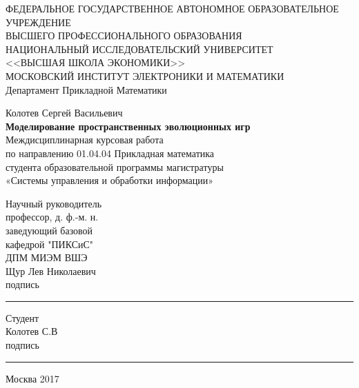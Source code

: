 \documentclass[14pt]{article}
\begin{document}
\begin{titlepage}
	\begin{center}
		ФЕДЕРАЛЬНОЕ ГОСУДАРСТВЕННОЕ АВТОНОМНОЕ ОБРАЗОВАТЕЛЬНОЕ  \\
		УЧРЕЖДЕНИЕ \\
		ВЫСШЕГО ПРОФЕССИОНАЛЬНОГО ОБРАЗОВАНИЯ \\
		НАЦИОНАЛЬНЫЙ ИССЛЕДОВАТЕЛЬСКИЙ УНИВЕРСИТЕТ\\
		<<ВЫСШАЯ ШКОЛА ЭКОНОМИКИ>> \\
		МОСКОВСКИЙ ИНСТИТУТ ЭЛЕКТРОНИКИ И МАТЕМАТИКИ \\
		\vspace{5ex}
		Департамент Прикладной Математики
		\vspace{0.5ex}
		
	\end{center}
	
	\vspace{15ex}
	\begin{center}
		Колотев Сергей Васильевич\\
		\vspace{1ex}
		\textbf{Моделирование пространственных эволюционных игр}\\
		\vspace{5ex}
		Междисциплинарная курсовая работа\\ 
		по направлению 01.04.04   Прикладная математика\\
		студента образовательной программы магистратуры\\
		«Системы управления и обработки информации»
		
		
	\end{center}	
	\vspace{15ex}
	\begin{flushright}
		\noindent
		Научный руководитель
		\\
		профессор, д. ф.-м. н.\\
		заведующий базовой\\
		кафедрой "ПИКСиС"\\
		ДПМ МИЭМ ВШЭ\\
		Щур Лев Николаевич\\
		подпись \noindent\rule{3cm}{0.4pt}
	\end{flushright}
	
		\begin{flushright}
		\noindent
		Студент\\
		Колотев С.В\\
		подпись \noindent\rule{3cm}{0.4pt}
	\end{flushright}
	
	
	\begin{center}	
		\vfill
		Москва 2017
	\end{center}
\end{titlepage}
\end{document}

